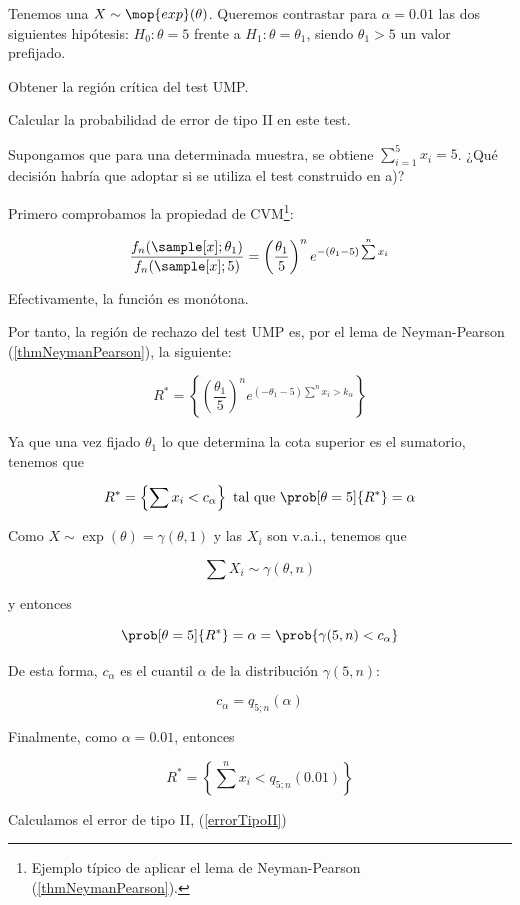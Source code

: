 \begin{problem}[1]
Tenemos una $X \sim \mop{exp}(\theta)$. Queremos contrastar para $\alpha = 0.01$ las dos siguientes hipótesis: $H_0: \theta = 5$ frente a $H_1: \theta = \theta_1$, siendo $\theta_1 > 5$ un valor prefijado.

\ppart Obtener la región crítica del test UMP.

\ppart Calcular la probabilidad de error de tipo II en este test.

\ppart Supongamos que para una determinada muestra, se obtiene $\sum_{i=1}^5 x_i= 5$. ¿Qué decisión habría que adoptar si se utiliza el test construido en a)?

\solution

\spart Primero comprobamos la propiedad de CVM\footnote{Ejemplo típico de aplicar el lema de Neyman-Pearson (\ref{thmNeymanPearson}).}:

\[ \frac{f_n(\sample[x];\theta_1)}{f_n(\sample[x];5)} = \left(\frac{\theta_1}{5}\right)^n e^{-(\theta_1 - 5)\sum\limits^n x_i} \]

Efectivamente, la función es monótona. %

Por tanto, la región de rechazo del test UMP es, por el lema de Neyman-Pearson (\ref{thmNeymanPearson}), la siguiente:

\[
R^{\ast} =
\left\{ \left(\frac{\theta_1}{5}\right)^n e^{(-\theta_1-5)\sum\limits^n x_i > k_\alpha}\right\}
\]

Ya que una vez fijado $\theta_1$ lo que determina la cota superior es el sumatorio, tenemos que

\[
R^{\ast} =
\left\{\sum x_i < c_{\alpha}\right\}
\text{ tal que }
\prob[\theta = 5]{ R^{\ast} } = \alpha
\]

Como $X \sim \exp(\theta) = \gamma(\theta, 1)$ y las $X_i$ son v.a.i., tenemos que 

\[ \sum X_i \sim \gamma(\theta, n) \]

y entonces

\[ \prob[\theta=5]{R^{\ast}} = \alpha = \prob{\gamma(5, n) < c_\alpha} \]

De esta forma, $c_\alpha$ es el cuantil $\alpha$ de la distribución $\gamma(5, n)$:

\[ c_\alpha = q_{5; n}(\alpha) \]

Finalmente, como $\alpha = 0.01 $, entonces

\[
R^{\ast} = \left\{ \sum\limits^n x_i < q_{5; n}(0.01) \right\}
\]

\spart Calculamos el error de tipo II, (\ref{errorTipoII})


\end{problem}
